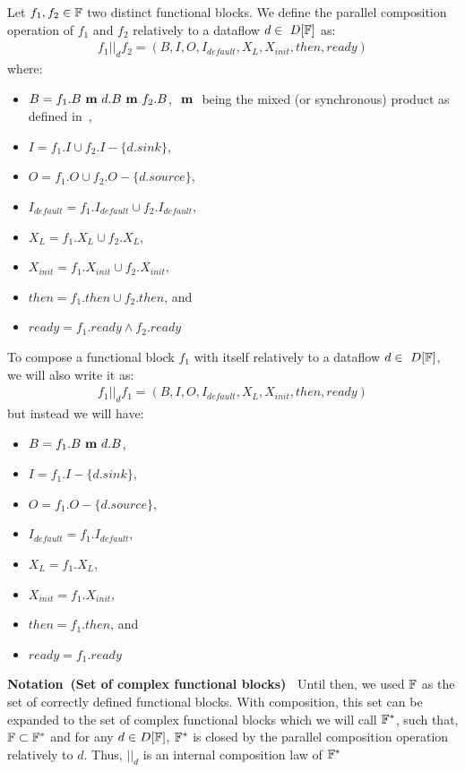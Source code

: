 \documentclass[runningheads]{llncs}
\newcommand{\Notation}[1]{\noindent\textbf{Notation~(#1)~}}
\newcommand{\mprod}{\text{ \textbf{m} }}
\begin{document}
\begin{definition}\label{composition}
    Let $f_1,f_2 \in\mathbb{F}$ two distinct functional blocks. We define the parallel composition operation of $f_1$ and $f_2$ relatively to a dataflow $d \in~D[\mathbb{F}]$ as:
    \begin{align}
        f_1 ||_d f_2 = (B, I, O, I_{default}, X_L, X_{init}, then, ready)
    \end{align}
    where: 
    \begin{itemize}
        \item $B = f_1.B \mprod d.B \mprod f_2.B$, $\mprod$ being the mixed (or synchronous) product as defined in~\cite{duboc_mixed_1986},
        \item $I = f_1.I\cup f_2.I -\{d.sink\}$,
        \item $O = f_1.O\cup f_2.O -\{d.source\}$,
        \item $I_{default} = f_1.I_{default}\cup f_2.I_{default}$,
        \item $X_L = f_1.X_L \cup f_2.X_L$,
        \item $X_{init} = f_1.X_{init} \cup f_2.X_{init}$,
        \item $then = f_1.then \cup f_2.then$, and
        \item $ready = f_1.ready \wedge f_2.ready$
    \end{itemize}
    To compose a functional block $f_1$ with itself relatively to a dataflow $d \in~D[\mathbb{F}]$, we will also write it as:
    \begin{align}
        f_1 ||_d f_1 = (B, I, O, I_{default}, X_L, X_{init}, then, ready)
    \end{align}
    but instead we will have:
    \begin{itemize}
        \item $B = f_1.B \mprod d.B$,
        \item $I = f_1.I -\{d.sink\}$,
        \item $O = f_1.O -\{d.source\}$,
        \item $I_{default} = f_1.I_{default}$,
        \item $X_L = f_1.X_L$,
        \item $X_{init} = f_1.X_{init}$,
        \item $then = f_1.then$, and
        \item $ready = f_1.ready$
    \end{itemize}
\end{definition}

\Notation{Set of complex functional blocks} Until then, we used $\mathbb{F}$ as the set of correctly defined functional blocks. With composition, this set can be expanded to the set of complex functional blocks which we will call $\mathbb{F}^*$, such that, $\mathbb{F} \subset \mathbb{F}^*$ and for any $d\in D[\mathbb{F}]$, $\mathbb{F}^*$ is closed by the parallel composition operation relatively to $d$. Thus, $||_d$ is an internal composition law of $\mathbb{F}^*$
\end{document}
